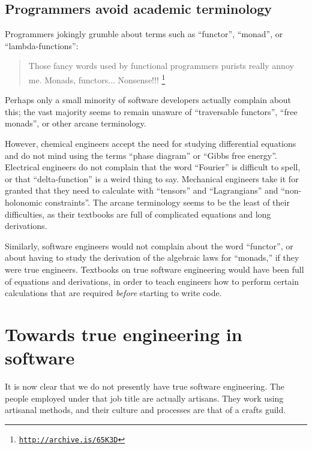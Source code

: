 \subsection{Programmers avoid academic terminology }

Programmers jokingly grumble about terms such as \textsf{``}functor\textsf{''}, \textsf{``}monad\textsf{''},
or \textsf{``}lambda-functions\textsf{''}:
\begin{quote}
{\small{}Those fancy words used by functional programmers purists
really annoy me. Monads, functors... Nonsense!!! }\footnote{\texttt{\href{http://archive.is/65K3D}{http://archive.is/65K3D}}}
\end{quote}
Perhaps only a small minority of software developers actually complain
about this; the vast majority seems to remain unaware of \textsf{``}traversable
functors\textsf{''}, \textsf{``}free monads\textsf{''}, or other arcane terminology.

However, chemical engineers accept the need for studying differential
equations and do not mind using the terms \textsf{``}phase diagram\textsf{''} or \textsf{``}Gibbs
free energy\textsf{''}. Electrical engineers do not complain that the word
\textsf{``}Fourier\textsf{''} is difficult to spell, or that \textsf{``}delta-function\textsf{''}
is a weird thing to say. Mechanical engineers take it for granted
that they need to calculate with \textsf{``}tensors\textsf{''} and \textsf{``}Lagrangians\textsf{''}
and \textsf{``}non-holonomic constraints\textsf{''}. The arcane terminology seems
to be the least of their difficulties, as their textbooks are full
of complicated equations and long derivations.

Similarly, software engineers would not complain about the word \textsf{``}functor\textsf{''},
or about having to study the derivation of the algebraic laws for
\textsf{``}monads,\textsf{''} \textemdash{} if they were true engineers. Textbooks
on true software engineering would have been full of equations and
derivations, in order to teach engineers how to perform certain calculations
that are required \emph{before} starting to write code.

\section{Towards true engineering in software}

It is now clear that we do not presently have true software engineering.
The people employed under that job title are actually artisans. They
work using artisanal methods, and their culture and processes are
that of a crafts guild.

